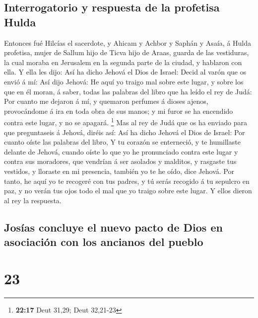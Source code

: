 \hypertarget{interrogatorio-y-respuesta-de-la-profetisa-hulda}{%
\subsection{Interrogatorio y respuesta de la profetisa
Hulda}\label{interrogatorio-y-respuesta-de-la-profetisa-hulda}}

 Entonces fué Hilcías el sacerdote, y Ahicam y Achbor y
Saphán y Asaía, á Hulda profetisa, mujer de Sallum hijo de Ticva hijo de
Araas, guarda de las vestiduras, la cual moraba en Jerusalem en la
segunda parte de la ciudad, y hablaron con ella.  Y ella
les dijo: Así ha dicho Jehová el Dios de Israel: Decid al varón que os
envió á mí:  Así dijo Jehová: He aquí yo traigo mal sobre
este lugar, y sobre los que en él moran, á saber, todas las palabras del
libro que ha leído el rey de Judá:  Por cuanto me dejaron
á mí, y quemaron perfumes á dioses ajenos, provocándome á ira en toda
obra de sus manos; y mi furor se ha encendido contra este lugar, y no se
apagará. \footnote{\textbf{22:17} Deut 31,29; Deut 32,21-23}
 Mas al rey de Judá que os ha enviado para que
preguntaseis á Jehová, diréis así: Así ha dicho Jehová el Dios de
Israel: Por cuanto oíste las palabras del libro,  Y tu
corazón se enterneció, y te humillaste delante de Jehová, cuando oíste
lo que yo he pronunciado contra este lugar y contra sus moradores, que
vendrían á ser asolados y malditos, y rasgaste tus vestidos, y lloraste
en mi presencia, también yo te he oído, dice Jehová.  Por
tanto, he aquí yo te recogeré con tus padres, y tú serás recogido á tu
sepulcro en paz, y no verán tus ojos todo el mal que yo traigo sobre
este lugar. Y ellos dieron al rey la respuesta.

\hypertarget{josuxedas-concluye-el-nuevo-pacto-de-dios-en-asociaciuxf3n-con-los-ancianos-del-pueblo}{%
\subsection{Josías concluye el nuevo pacto de Dios en asociación con los
ancianos del
pueblo}\label{josuxedas-concluye-el-nuevo-pacto-de-dios-en-asociaciuxf3n-con-los-ancianos-del-pueblo}}

\hypertarget{section-22}{%
\section{23}\label{section-22}}

